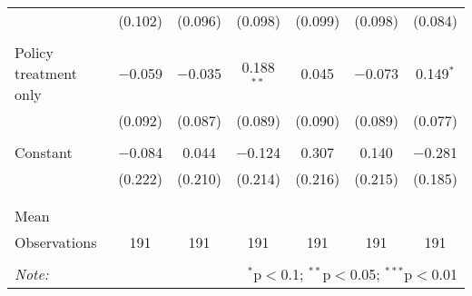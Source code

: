 \begin{tabular}{@{\extracolsep{5pt}}lcccccc}
  & (0.102) & (0.096) & (0.098) & (0.099) & (0.098) & (0.084) \\ 
  & & & & & & \\ 
 Policy treatment only & $-$0.059 & $-$0.035 & 0.188$^{**}$ & 0.045 & $-$0.073 & 0.149$^{*}$ \\ 
  & (0.092) & (0.087) & (0.089) & (0.090) & (0.089) & (0.077) \\ 
  & & & & & & \\ 
 Constant & $-$0.084 & 0.044 & $-$0.124 & 0.307 & 0.140 & $-$0.281 \\ 
  & (0.222) & (0.210) & (0.214) & (0.216) & (0.215) & (0.185) \\ 
  & & & & & & \\ 
\hline \\[-1.8ex] 
Mean &  &  &  &  &  &  \\ 
Observations & 191 & 191 & 191 & 191 & 191 & 191 \\ 
\hline 
\hline \\[-1.8ex] 
\textit{Note:}  & \multicolumn{6}{r}{$^{*}$p$<$0.1; $^{**}$p$<$0.05; $^{***}$p$<$0.01} \\ 
\end{tabular} 

